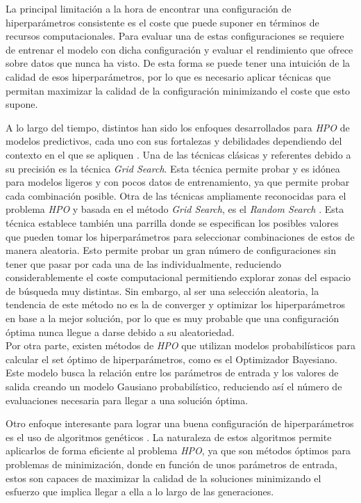 \documentclass{uathesis-es}
\begin{document}
	La principal limitación a la hora de encontrar una configuración de hiperparámetros consistente es el coste que puede suponer en términos de recursos computacionales. Para evaluar una de estas configuraciones se requiere de entrenar el modelo con dicha configuración y evaluar el rendimiento que ofrece sobre datos que nunca ha visto. De esta forma se puede tener una intuición de la calidad de esos hiperparámetros, por lo que es necesario aplicar técnicas que permitan maximizar la calidad de la configuración minimizando el coste que esto supone.
	
	
	A lo largo del tiempo, distintos han sido los enfoques desarrollados para \textit{HPO} de modelos predictivos, cada uno con sus fortalezas y debilidades dependiendo del contexto en el que se apliquen \cite{yu2020hyperparameter}. Una de las técnicas clásicas y referentes debido a su precisión es la técnica \textit{Grid Search}. Esta técnica permite probar y es idónea para modelos ligeros y con pocos datos de entrenamiento, ya que permite probar cada combinación posible. Otra de las técnicas ampliamente reconocidas para el problema \textit{HPO} y basada en el método \textit{Grid Search}, es el \textit{Random Search} \cite{bergstra2012random}. Esta técnica establece también una parrilla donde se especifican los posibles valores que pueden tomar los hiperparámetros para seleccionar combinaciones de estos de manera aleatoria. Esto permite probar un gran número de configuraciones sin tener que pasar por cada una de las individualmente, reduciendo considerablemente el coste computacional permitiendo explorar zonas del espacio de búsqueda muy distintas. Sin embargo, al ser una selección aleatoria, la tendencia de este método no es la de converger y optimizar los hiperparámetros en base a la mejor solución, por lo que es muy probable que una configuración óptima nunca llegue a darse debido a su aleatoriedad.\\
	Por otra parte, existen métodos de \textit{HPO} que utilizan modelos probabilísticos para calcular el set óptimo de hiperparámetros, como es el Optimizador Bayesiano. Este modelo busca la relación entre los parámetros de entrada y los valores de salida creando un modelo Gausiano probabilístico, reduciendo así el número de evaluaciones necesaria para llegar a una solución óptima.
	
	Otro enfoque interesante para lograr una buena configuración de hiperparámetros es el uso de algoritmos genéticos \cite{alibrahim2021hyperparameter}. La naturaleza de estos algoritmos permite aplicarlos de forma eficiente al problema \textit{HPO}, ya que son métodos óptimos para problemas de minimización, donde en función de unos parámetros de entrada, estos son capaces de maximizar la calidad de la soluciones minimizando el esfuerzo que implica llegar a ella a lo largo de las generaciones.
	
\end{document}
